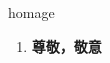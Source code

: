 
\begin{frame}
{\huge homage}
\begin{center}
\begin{enumerate}\Large
  \item \textbf{尊敬，敬意}
\end{enumerate}
\end{center}
\end{frame}
